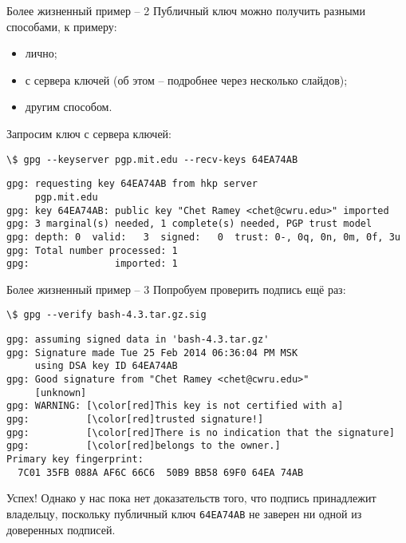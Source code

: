 \documentclass[presentation]{beamer}
\begin{document}

\begin{frame}[fragile]{Более жизненный пример -- 2}
  Публичный ключ можно получить разными способами, к примеру:
  \begin{itemize}
  \item лично;
  \item с сервера ключей (об этом -- подробнее через несколько
    слайдов);
  \item другим способом.\newline
  \end{itemize}
  Запросим ключ с сервера ключей:
  \begin{Verbatim}[commandchars=\\\[\]]
\$ gpg --keyserver pgp.mit.edu --recv-keys 64EA74AB
  \end{Verbatim}
  \footnotesize
  \begin{Verbatim}[commandchars=\\\[\]]
gpg: requesting key 64EA74AB from hkp server
     pgp.mit.edu
gpg: key 64EA74AB: public key "Chet Ramey <chet@cwru.edu>" imported
gpg: 3 marginal(s) needed, 1 complete(s) needed, PGP trust model
gpg: depth: 0  valid:   3  signed:   0  trust: 0-, 0q, 0n, 0m, 0f, 3u
gpg: Total number processed: 1
gpg:               imported: 1
  \end{Verbatim}
  \normalsize
\end{frame}

\begin{frame}[fragile]{Более жизненный пример -- 3}
  Попробуем проверить подпись ещё раз:
  \begin{Verbatim}[commandchars=\\\[\]]
\$ gpg --verify bash-4.3.tar.gz.sig
  \end{Verbatim}
  \footnotesize
  \begin{Verbatim}[commandchars=\\\[\]]
gpg: assuming signed data in 'bash-4.3.tar.gz'
gpg: Signature made Tue 25 Feb 2014 06:36:04 PM MSK
     using DSA key ID 64EA74AB
gpg: Good signature from "Chet Ramey <chet@cwru.edu>"
     [unknown]
gpg: WARNING: [\color[red]This key is not certified with a]
gpg:          [\color[red]trusted signature!]
gpg:          [\color[red]There is no indication that the signature]
gpg:          [\color[red]belongs to the owner.]
Primary key fingerprint:
  7C01 35FB 088A AF6C 66C6  50B9 BB58 69F0 64EA 74AB
  \end{Verbatim}
  \normalsize

  \vspace{5 mm}

  Успех!  Однако у нас пока нет доказательств того, что подпись
  принадлежит владельцу, поскольку публичный ключ \texttt{64EA74AB} не
  заверен ни одной из доверенных подписей.
\end{frame}
\end{document}
